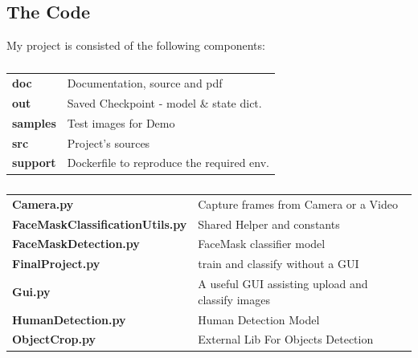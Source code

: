 \subsection{The Code}
My project is consisted of the following components:

\begin{table}[H]
    \centering
    \begin{tabular}{ll}
        \midrule
        \textbf{doc} & Documentation, source and pdf  \\
        \textbf{out} & Saved Checkpoint - model \& state dict. \\
        \textbf{samples} & Test images for Demo \\
        \textbf{src} & Project's sources \\
        \textbf{support} & Dockerfile to reproduce the required env. \\
        \bottomrule
    \end{tabular}
    \caption{}
    \label{tab:}
\end{table}


\begin{table}[H]
    \centering
    \begin{tabular}{ll}
        \midrule
        \textbf{Camera.py} & Capture frames from Camera or a Video  \\
        \textbf{FaceMaskClassificationUtils.py} & Shared Helper and constants  \\
        \textbf{FaceMaskDetection.py} & FaceMask classifier model   \\
        \textbf{FinalProject.py} & train and classify without a GUI \\
        \textbf{Gui.py} & A useful GUI assisting upload and classify images \\
        \textbf{HumanDetection.py} & Human Detection Model \\
        \textbf{ObjectCrop.py} & External Lib For Objects Detection \\
        \bottomrule
    \end{tabular}
    \caption{}
    \label{tab:2}
\end{table}

